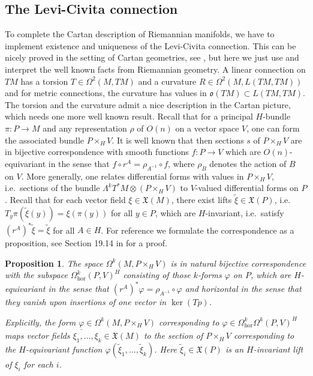 \documentclass[12pt,a4paper]{amsart}
\def\frak{\mathfrak}
\let\phi\varphi
\newcommand{\x}{\times}
\renewcommand{\o}{\circ}
\newcommand{\ph}{\phi}
\newcommand{\La}{\Lambda}
\newcommand{\Om}{\Omega}
\newcommand{\hor}{\text{hor}}
\newcounter{theorem}
\numberwithin{theorem}{section}
\numberwithin{equation}{section}
\newtheorem{prop}[theorem]{Proposition}
\theoremstyle{definition}
\theoremstyle{remark}
\begin{document}
\subsection{The Levi-Civita connection}\label{3.2}
To complete the Cartan description of Riemannian manifolds, we have to implement
existence and uniqueness of the Levi-Civita connection. This can be nicely proved in
the setting of Cartan geometries, see \cite{Sharpe}, but here we just use and
interpret the well known facts from Riemannian geometry. A linear connection on $TM$
has a torsion $T\in \Om^2(M,TM)$ and a curvature $R\in\Om^2(M,L(TM,TM))$ and for
metric connections, the curvature has values in $\frak o(TM)\subset L(TM,TM)$. The
torsion and the curvature admit a nice description in the Cartan picture, which needs
one more well known result. Recall that for a principal $H$-bundle $\pi:P\to M$ and
any representation $\rho$ of $O(n)$ on a vector space $V$, one can form the
associated bundle $P\x_HV$. It is well known that then sections $s$ of $P\x_HV$ are
in bijective correspondence with smooth functions $f:P\to V$ which are
$O(n)$-equivariant in the sense that $f\o r^A=\rho_{A^{-1}}\o f$, where $\rho_B$
denotes the action of $B$ on $V$. More generally, one relates differential forms with
values in $P\x_H V$, i.e.\ sections of the bundle $\La^kT^*M\otimes(P\x_HV)$ to
$V$-valued differential forms on $P$. Recall that for each vector field $\xi\in\frak
X(M)$, there exist lifts $\widetilde{\xi}\in\frak X(P)$,
i.e.\ $T_y\pi(\widetilde{\xi}(y))=\xi(\pi(y))$ for all $y\in P$, which are
$H$-invariant, i.e.\ satisfy $(r^A)^*\widetilde{\xi}=\widetilde{\xi}$ for all $A\in
H$. For reference we formulate the correspondence as a proposition, see Section 19.14
in \cite{Michor:topics} for a proof.
\begin{prop}\label{prop3.2}
  The space $\Om^k(M,P\x_H V)$ is in natural bijective correspondence with the
  subspace $\Om^k_{\hor}(P,V)^H$ consisting of those $k$-forms $\ph$ on $P$, which are
  $H$-equivariant in the sense that $(r^A)^*\ph=\rho_{A^{-1}}\o\ph$ and horizontal in
  the sense that they vanish upon insertions of one vector in $\ker(Tp)$.

  Explicitly, the form $\underline{\ph}\in \Om^k(M,P\x_H V)$ corresponding to $\ph\in
  \Om^k_{\hor}\Om^k(P,V)^H$ maps vector fields $\xi_1,\dots,\xi_k\in\frak X(M)$ to
  the section of $P\x_HV$ corresponding to the $H$-equivariant function
  $\ph(\tilde\xi_1,\dots,\tilde\xi_k)$. Here $\tilde\xi_i\in\frak X(P)$ is an
  $H$-invariant lift of $\xi_i$ for each $i$.
\end{prop}
\end{document}
